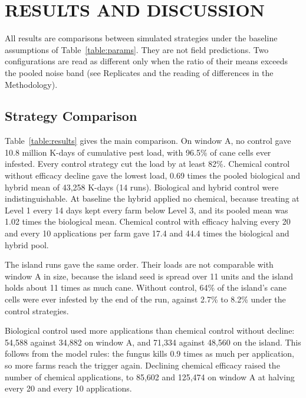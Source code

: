 \section{RESULTS AND DISCUSSION}

\noindent{}

All results are comparisons between simulated strategies under the baseline assumptions of Table~\ref{table:params}. They are not field predictions. Two configurations are read as different only when the ratio of their means exceeds the pooled noise band (see Replicates and the reading of differences in the Methodology).

\subsection{Strategy Comparison}

Table~\ref{table:results} gives the main comparison. On window A, no control gave 10.8 million K-days of cumulative pest load, with 96.5\% of cane cells ever infested. Every control strategy cut the load by at least 82\%. Chemical control without efficacy decline gave the lowest load, 0.69 times the pooled biological and hybrid mean of 43,258 K-days (14 runs). Biological and hybrid control were indistinguishable. At baseline the hybrid applied no chemical, because treating at Level 1 every 14 days kept every farm below Level 3, and its pooled mean was 1.02 times the biological mean. Chemical control with efficacy halving every 20 and every 10 applications per farm gave 17.4 and 44.4 times the biological and hybrid pool.

The island runs gave the same order. Their loads are not comparable with window A in size, because the island seed is spread over 11 units and the island holds about 11 times as much cane. Without control, 64\% of the island's cane cells were ever infested by the end of the run, against 2.7\% to 8.2\% under the control strategies.

Biological control used more applications than chemical control without decline: 54,588 against 34,882 on window A, and 71,334 against 48,560 on the island. This follows from the model rules: the fungus kills 0.9 times as much per application, so more farms reach the trigger again. Declining chemical efficacy raised the number of chemical applications, to 85,602 and 125,474 on window A at halving every 20 and every 10 applications.

